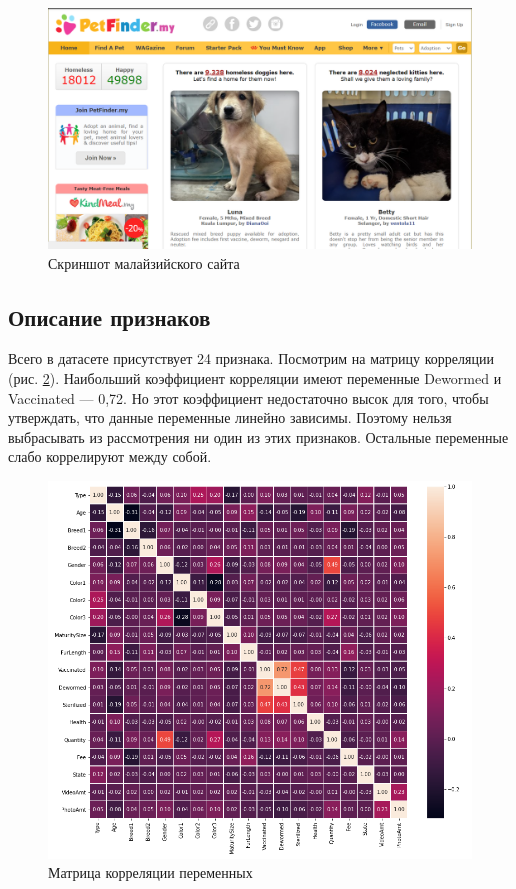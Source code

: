 \documentclass[14pt]{mmcs_article}
\begin{document}
\begin{figure}[H]
	\centering
	\includegraphics[scale=0.4]{petfinder.png}
	\caption{Скриншот малайзийского сайта}\label{analyse:petfinder}
\end{figure}


\subsection{Описание признаков}

Всего в датасете присутствует 24 признака. Посмотрим на матрицу корреляции (рис. \ref{analyse:corr}). Наибольший коэффициент корреляции имеют переменные Dewormed и Vaccinated --- 0,72. Но этот коэффициент недостаточно высок для того, чтобы утверждать, что данные переменные линейно зависимы. Поэтому нельзя выбрасывать из рассмотрения ни один из этих признаков. Остальные переменные слабо коррелируют между собой.

\begin{figure}[H]
	\centering
	\includegraphics[scale=0.55]{corr.png}
	\caption{Матрица корреляции переменных}\label{analyse:corr}
\end{figure}
\end{document}
